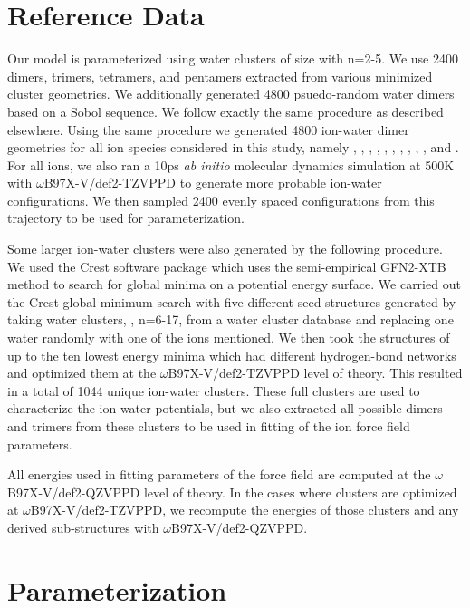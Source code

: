 \documentclass[journal=jacsat,manuscript=article]{achemso}
\begin{document}
\section*{Reference Data}

Our model is parameterized using water clusters of size  with n=2-5.
We use 2400 dimers, trimers, tetramers, and pentamers extracted from various minimized
cluster geometries. We additionally generated 4800 psuedo-random water dimers
based on a Sobol sequence. We follow exactly the same procedure as described elsewhere.\cite{misquitta2008first}
Using the same procedure we generated 4800 ion-water dimer geometries for all ion species considered in this study,
namely , , , , , , , , , , and .
For all ions, we also ran a 10ps \textit{ab initio} molecular dynamics simulation
at 500K with $\omega$B97X-V/def2-TZVPPD to generate more probable ion-water configurations. We then sampled 2400 evenly spaced
configurations from this trajectory to be used for parameterization.

Some larger ion-water clusters were also generated by the following procedure.
We used the Crest software package\cite{pracht2020automated} which uses the semi-empirical GFN2-XTB\cite{bannwarth2019gfn2}
method to search for global minima on a potential energy surface. We carried out the Crest global minimum
search with five different seed structures generated by taking water clusters, , n=6-17, from a
water cluster database\cite{rakshit2019atlas} and replacing one water randomly with one of the ions mentioned.
We then took the structures of up to the ten lowest energy minima which had different hydrogen-bond
networks and optimized them at the $\omega$B97X-V/def2-TZVPPD level of theory. This resulted in a total
of 1044 unique ion-water clusters. These full clusters
are used to characterize the ion-water potentials, but we also extracted all possible dimers
and trimers from these clusters to be used in fitting of the ion force field parameters.

All energies used in fitting parameters of the force field are computed
at the $\omega$B97X-V/def2-QZVPPD level of theory. In the cases where clusters are optimized at
$\omega$B97X-V/def2-TZVPPD, we recompute the energies of those clusters and any derived sub-structures
with $\omega$B97X-V/def2-QZVPPD.

\section*{Parameterization}
\end{document}
